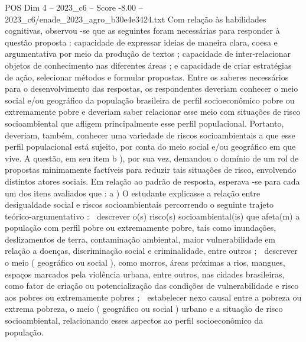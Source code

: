 \begin{textsample}{POS Dim 4 – 2023\_c6 – Score -8.00 – 2023\_c6/enade\_2023\_agro\_b30e4e3424.txt}
Com relação às habilidades cognitivas, observou -se que as seguintes foram necessárias para responder à questão proposta : capacidade de expressar ideias de maneira clara, coesa e argumentativa por meio da produção de textos ; capacidade de inter-relacionar objetos de conhecimento nas diferentes áreas ; e capacidade de criar estratégias de ação, selecionar métodos e formular propostas.
Entre os saberes necessários para o desenvolvimento das respostas, os respondentes deveriam conhecer o meio social e/ou geográfico da população brasileira de perfil socioeconômico pobre ou extremamente pobre e deveriam saber relacionar esse meio com situações de risco socioambiental que afligem principalmente esse perfil populacional.
Portanto, deveriam, também, conhecer uma variedade de riscos socioambientais a que esse perfil populacional está sujeito, por conta do meio social e/ou geográfico em que vive.
A questão, em seu item b ), por sua vez, demandou o domínio de um rol de propostas minimamente factíveis para reduzir tais situações de risco, envolvendo distintos atores sociais.
Em relação ao padrão de resposta, esperava -se para cada um dos itens avaliados que : a ) O estudante explicasse a relação entre desigualdade social e riscos socioambientais percorrendo o seguinte trajeto teórico-argumentativo :  descrever o(s) risco(s) socioambiental(is) que afeta(m) a população com perfil pobre ou extremamente pobre, tais como inundações, deslizamentos de terra, contaminação ambiental, maior vulnerabilidade em relação a doenças, discriminação social e criminalidade, entre outros ;  descrever o meio ( geográfico ou social ), como morros, áreas próximas a rios, mangues, espaços marcados pela violência urbana, entre outros, nas cidades brasileiras, como fator de criação ou potencialização das condições de vulnerabilidade e risco aos pobres ou extremamente pobres ;  estabelecer nexo causal entre a pobreza ou extrema pobreza, o meio ( geográfico ou social ) urbano e a situação de risco socioambiental, relacionando esses aspectos ao perfil socioeconômico da população.

\end{textsample}
